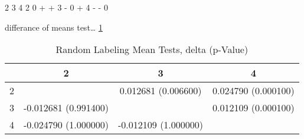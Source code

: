   2 3 4
2 0 + +
3 - 0 +
4 - - 0

differance of means test\ldots
\ref{randomLabelTable}

\begin{table}
\caption{Random Labeling Mean Tests,  delta (p-Value)}
\label{randomLabelTable}
\begin{tabular}{|c||c|c|c|}
\hline
&2&3&4\\
\hline
\hline
2& & 0.012681 (0.006600)& 0.024790 (0.000100)\\
\hline
3& -0.012681 (0.991400)& & 0.012109 (0.000100)\\
\hline
4& -0.024790 (1.000000)& -0.012109 (1.000000)& \\
\hline
\end{tabular} \end{table}






